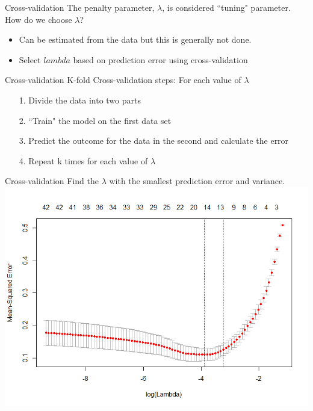 \documentclass{beamer}\usepackage[]{graphicx}\usepackage[]{color}
\begin{document}
\begin{frame}{Cross-validation}
The penalty parameter, $\lambda$, is considered ``tuning" parameter.\\
How do we choose $\lambda$?
\pause
\bigskip
\begin{itemize}
\item Can be estimated from the data but this is generally not done.
\item Select $lambda$ based on prediction error using cross-validation
\end{itemize}
\end{frame}

\begin{frame}{Cross-validation}
K-fold Cross-validation steps:
\bigskip
For each value of $\lambda$
\begin{itemize}
\item[1.] Divide the data into two parts
\item[2.] ``Train" the model on the first data set
\item[3.] Predict the outcome for the data in the second and calculate the error
\item[4.] Repeat k times for each value of $\lambda $
\end{itemize}
\end{frame}

\begin{frame}{Cross-validation}
Find the $\lambda$ with the smallest prediction error and variance.\\
\includegraphics[scale=.38]{ExampleCVplot}\\
\end{frame}
\end{document}
